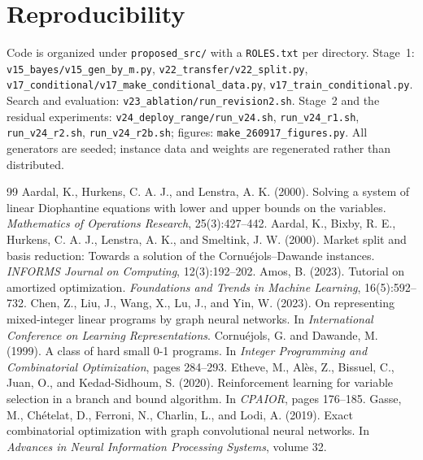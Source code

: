 \documentclass[final,5p,times,twocolumn]{elsarticle}
\begin{document}
\section*{Reproducibility}
Code is organized under \texttt{proposed\_src/} with a \texttt{ROLES.txt} per directory. Stage~1: \texttt{v15\_bayes/v15\_gen\_by\_m.py}, \texttt{v22\_transfer/v22\_split.py}, \texttt{v17\_conditional/v17\_make\_conditional\_data.py}, \texttt{v17\_train\_conditional.py}. Search and evaluation: \texttt{v23\_ablation/run\_revision2.sh}. Stage~2 and the residual experiments: \texttt{v24\_deploy\_range/run\_v24.sh}, \texttt{run\_v24\_r1.sh}, \texttt{run\_v24\_r2.sh}, \texttt{run\_v24\_r2b.sh}; figures: \texttt{make\_260917\_figures.py}. All generators are seeded; instance data and weights are regenerated rather than distributed.

\begin{thebibliography}{99}
 Aardal, K., Hurkens, C. A. J., and Lenstra, A. K. (2000). Solving a system of linear Diophantine equations with lower and upper bounds on the variables. \emph{Mathematics of Operations Research}, 25(3):427--442.
 Aardal, K., Bixby, R. E., Hurkens, C. A. J., Lenstra, A. K., and Smeltink, J. W. (2000). Market split and basis reduction: Towards a solution of the Cornu\'ejols--Dawande instances. \emph{INFORMS Journal on Computing}, 12(3):192--202.
 Amos, B. (2023). Tutorial on amortized optimization. \emph{Foundations and Trends in Machine Learning}, 16(5):592--732.
 Chen, Z., Liu, J., Wang, X., Lu, J., and Yin, W. (2023). On representing mixed-integer linear programs by graph neural networks. In \emph{International Conference on Learning Representations}.
 Cornu\'ejols, G. and Dawande, M. (1999). A class of hard small 0-1 programs. In \emph{Integer Programming and Combinatorial Optimization}, pages 284--293.
 Etheve, M., Al\`es, Z., Bissuel, C., Juan, O., and Kedad-Sidhoum, S. (2020). Reinforcement learning for variable selection in a branch and bound algorithm. In \emph{CPAIOR}, pages 176--185.
 Gasse, M., Ch\'etelat, D., Ferroni, N., Charlin, L., and Lodi, A. (2019). Exact combinatorial optimization with graph convolutional neural networks. In \emph{Advances in Neural Information Processing Systems}, volume 32.

\end{thebibliography}
\end{document}
